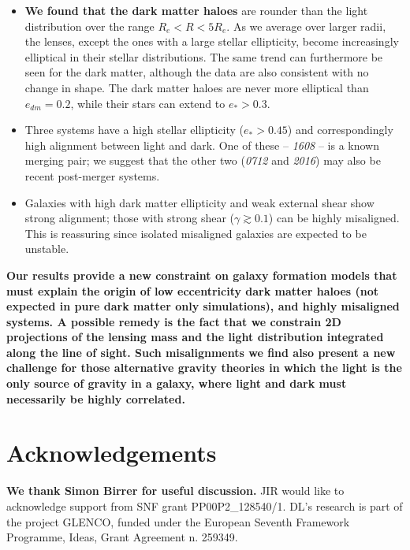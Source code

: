 \documentclass[useAMS,usenatbib]{mn2e}
\newcommand{\cb}[1]{{\color{red} \textbf{#1}}}
\begin{document}
\begin{itemize}
\item \cb{We found that the dark matter haloes} are rounder than the light distribution over the range $R_e < R < 5R_e$. As we average over larger radii, the lenses, except the ones with a large stellar ellipticity, become increasingly elliptical in their stellar distributions. The same trend can furthermore be seen for the dark matter, although the data are also consistent with no change in shape. The dark matter haloes are never more elliptical than $e_{dm} = 0.2$, while their stars can extend to $e_* > 0.3$.

\item Three systems have a high stellar ellipticity ($e_* > 0.45$) and correspondingly high alignment between light and dark. One of these -- {\it1608} -- is a known merging pair; we suggest that the other two ({\it0712} and {\it2016}) may also be recent post-merger systems. 

\item Galaxies with high dark matter ellipticity and weak external shear show strong alignment; those with strong shear ($\gamma \gtrsim 0.1$) can be highly misaligned. This is reassuring since isolated misaligned galaxies are expected to be unstable.
\end{itemize}

\cb{Our results provide a new constraint on galaxy formation models that must explain the origin of low eccentricity dark matter haloes (not expected in pure dark matter only simulations), and highly misaligned systems. A possible remedy is the fact that we constrain 2D projections of the lensing mass and the light distribution integrated along the line of sight. Such misalignments we find also present a new challenge for those alternative gravity theories in which the light is the only source of gravity in a galaxy, where light and dark must necessarily be highly correlated.}


\section{Acknowledgements}\label{sec:acknowledgements}
\cb{We thank Simon Birrer for useful discussion.} JIR would like to acknowledge support from SNF grant PP00P2\_128540/1. DL's research is part of the project GLENCO, funded under the European Seventh Framework Programme, Ideas, Grant Agreement n. 259349.




\end{document}
